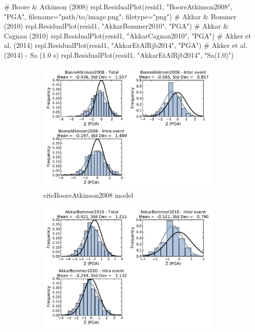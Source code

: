 \begin{python}
# Boore & Atkinson (2008)
rspl.ResidualPlot(resid1, "BooreAtkinson2008", "PGA",
                  filename="path/to/image.png",
                  filetype="png")
# Akkar & Bommer (2010)
rspl.ResidualPlot(resid1, "AkkarBommer2010", "PGA")
# Akkar & Cagnan (2010)
rspl.ResidualPlot(resid1, "AkkarCagnan2010", "PGA")
# Akker et al. (2014)
rspl.ResidualPlot(resid1, "AkkarEtAlRjb2014", "PGA")
# Akker et al. (2014) - Sa (1.0 s)
rspl.ResidualPlot(resid1, "AkkarEtAlRjb2014", "Sa(1.0)")
\end{python}

\begin{figure}[htb]
  \centering
  \begin{subfigure}[b]{0.49\textwidth}
      \includegraphics[width=\textwidth]{./figures/residuals/BA2008_Residuals_PGA.pdf}
      \caption{citeBooreAtkinson2008 model}
      \label{fig:pga_res_ba2008}
  \end{subfigure}
    \begin{subfigure}[b]{0.49\textwidth}
      \includegraphics[width=\textwidth]{./figures/residuals/AB2010_Residuals_PGA.pdf}

\end{subfigure}
\end{figure}
